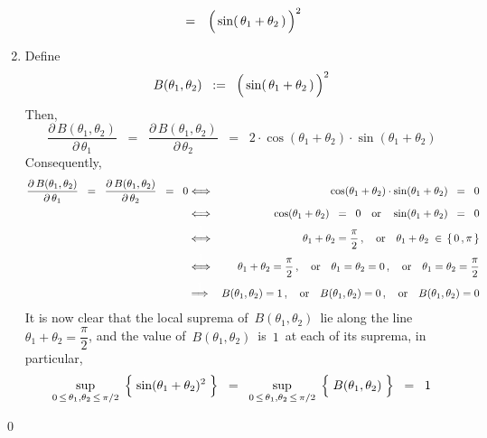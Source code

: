 \begin{enumerate}
\begin{eqnarray*}
	\\
	& = &
		\left(\,\sin(\,\theta_{1} \overset{{\color{white}.}}{+} \theta_{2}\,) \,\right)^{2}
	\end{eqnarray*}
\item
	Define
	\begin{equation*}
	B(\theta_{1},\theta_{2})
	\;\; := \;\;
		\left(\,\sin(\,\theta_{1} \overset{{\color{white}.}}{+} \theta_{2}\,) \,\right)^{2}
	\end{equation*}
	Then,
	\begin{equation*}
	\dfrac{\partial\, B(\theta_{1},\theta_{2})}{\partial\,\theta_{1}}
	\;\; = \;\;
		\dfrac{\partial\, B(\theta_{1},\theta_{2})}{\partial\,\theta_{2}}
	\;\; = \;\;
		2 \cdot \cos(\theta_{1} + \theta_{2}) \cdot \sin(\theta_{1} + \theta_{2})
	\end{equation*}
	Consequently,
	\begin{eqnarray*}
		\dfrac{\partial\, B(\theta_{1},\theta_{2})}{\partial\,\theta_{1}}
		\;\; = \;\;
			\dfrac{\partial\, B(\theta_{1},\theta_{2})}{\partial\,\theta_{2}}
		\;\; = \;\;
			0
	& \Longleftrightarrow &
		\cos(\theta_{1} + \theta_{2}) \cdot \sin(\theta_{1} + \theta_{2}) \;\; = \;\; 0
	\\
	& \overset{{\color{white}\textnormal{\small-}}}{\Longleftrightarrow} &
		\cos(\theta_{1} + \theta_{2}) \;\; = \;\; 0
		\quad\textnormal{or}\quad
		\sin(\theta_{1} + \theta_{2}) \;\; = \;\; 0
	\\
	& \overset{{\color{white}\textnormal{\Large1}}}{\Longleftrightarrow} &
		\theta_{1} + \theta_{2} = \dfrac{\pi}{2}\,,
		\quad\textnormal{or}\quad
		\theta_{1} + \theta_{2} \; \in \, \{\,0\,,\pi\,\}
	\\
	& \overset{{\color{white}\textnormal{\Large1}}}{\Longleftrightarrow} &
		\theta_{1} + \theta_{2} = \dfrac{\pi}{2}\,,
		\quad\textnormal{or}\quad
		\theta_{1} = \theta_{2} = 0\,,
		\quad\textnormal{or}\quad
		\theta_{1} = \theta_{2} = \dfrac{\pi}{2}
	\\
	& \overset{{\color{white}\textnormal{\large1}}}{\Longrightarrow} &
		B(\theta_{1},\theta_{2}) = 1\,,
		\quad\textnormal{or}\quad
		B(\theta_{1},\theta_{2}) = 0\,,
		\quad\textnormal{or}\quad
		B(\theta_{1},\theta_{2}) = 0
	\end{eqnarray*}
	It is now clear that the local suprema of \,$B(\theta_{1},\theta_{2})$\,
	lie along the line \,$\theta_{1} + \theta_{2} = \dfrac{\pi}{2}$, and
	the value of \,$B(\theta_{1},\theta_{2})$\, is \,$1$\, at each of its suprema,
	in particular,
	\begin{equation*}
	\underset{0\,\leq\,\theta_{1},\theta_{2}\,\leq\,\pi/2}{\sup}\;
	\left\{\;\overset{{\color{white}.}}{\sin}(\theta_{1}+\theta_{2})^{2}\;\right\}
	\;\; = \;\;
		\underset{0\,\leq\,\theta_{1},\theta_{2}\,\leq\,\pi/2}{\sup}\;
		\left\{\;\overset{{\color{white}.}}{B}(\theta_{1},\theta_{2})\;\right\}
	\;\; = \;\;
		1
	\end{equation*}
\end{enumerate}
\qed


\renewcommand{\theenumi}{\roman{enumi}}
\renewcommand{\labelenumi}{\textnormal{(\theenumi)}$\;\;$}

